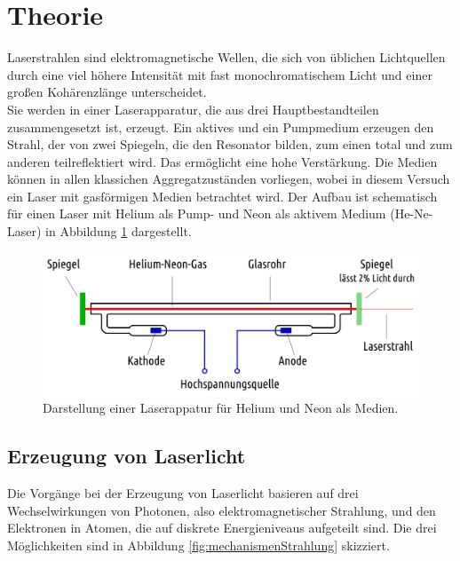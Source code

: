 \section{Theorie}
\label{sec:Theorie}

Laserstrahlen sind elektromagnetische Wellen, die sich von üblichen Lichtquellen durch eine viel höhere Intensität mit fast monochromatischem Licht und einer großen Kohärenzlänge unterscheidet.\\
Sie werden in einer Laserapparatur, die aus drei Hauptbestandteilen zusammengesetzt ist, erzeugt. Ein aktives und ein Pumpmedium erzeugen den Strahl, der von zwei Spiegeln, die den Resonator bilden, zum einen total und zum anderen teilreflektiert wird. Das  ermöglicht eine hohe Verstärkung. Die Medien können in allen klassichen Aggregatzuständen vorliegen, wobei in diesem Versuch ein Laser mit gasförmigen Medien betrachtet wird. Der Aufbau ist schematisch für einen Laser mit Helium als Pump- und Neon als aktivem Medium (He-Ne-Laser) in Abbildung \ref{fig:skizzeLaser} dargestellt.

\begin{figure}
  \centering
  \includegraphics[width=\textwidth]{data/apparatur.png}
  \caption{Darstellung einer Laserappatur für Helium und Neon als Medien.\cite{leifi}}
  \label{fig:skizzeLaser}
\end{figure}

\subsection{Erzeugung von Laserlicht}
\label{sec:erzeugung}
Die Vorgänge bei der Erzeugung von Laserlicht basieren auf drei Wechselwirkungen von Photonen, also elektromagnetischer Strahlung, und den Elektronen in Atomen, die auf diskrete Energieniveaus aufgeteilt sind. Die drei Möglichkeiten sind in Abbildung \ref{fig:mechanismenStrahlung} skizziert.

